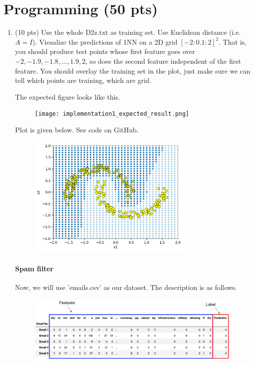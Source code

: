 \documentclass[a4paper]{article}
\theoremstyle{definition}
\newenvironment{soln}{
    \leavevmode\color{blue}\ignorespaces
}{}
\begin{document}
\pagebreak

\section{Programming (50 pts)}
\begin{enumerate}
	\item (10 pts) Use the whole D2z.txt as training set.  Use Euclidean distance (i.e. $A=I$).
	Visualize the predictions of 1NN on a 2D grid $[-2:0.1:2]^2$.
	That is, you should produce test points whose first feature goes over $-2, -1.9, -1.8, \ldots, 1.9, 2$, so does the second feature independent of the first feature.
	You should overlay the training set in the plot, just make sure we can tell which points are training, which are grid.
	
	The expected figure looks like this.
	\begin{figure}[h]
		\centering
		\texttt{[image: implementation1\_expected\_result.png]}
	\end{figure}


	\begin{soln}

	Plot is given below. See code on GitHub.

		\begin{figure}[h]
			\centering
			\includegraphics[width=8cm]{figures/Q2_1.png}
		\end{figure}
	\end{soln}
	
	\paragraph{Spam filter} Now, we will use 'emails.csv' as our dataset. The description is as follows.
	\begin{figure}[h]
		\centering
		\includegraphics[width=\linewidth]{email_head.png}
	\end{figure}
	

\end{enumerate}
\end{document}

